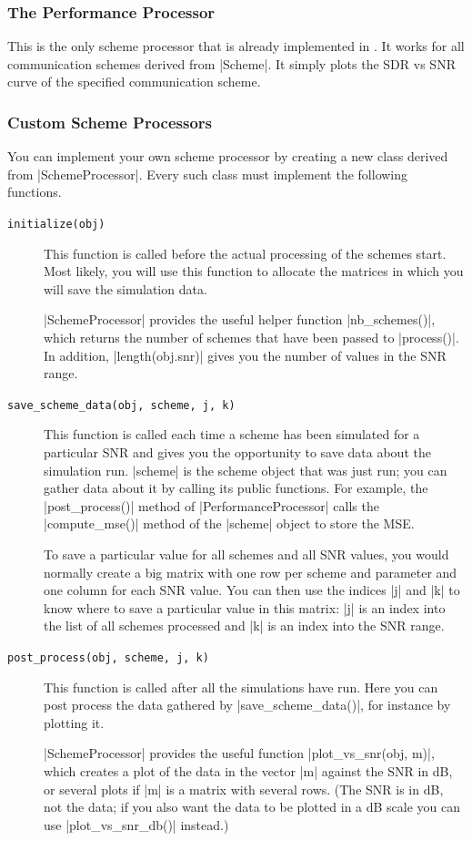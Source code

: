 \subsubsection{The Performance Processor}

This is the only scheme processor that is already implemented in \jscsim. It
works for all communication schemes derived from |Scheme|. It simply plots the
SDR vs SNR curve of the specified communication scheme. 


\subsubsection{Custom Scheme Processors}

You can implement your own scheme processor by creating a new class derived from
|SchemeProcessor|. Every such class must implement the following functions.
\begin{description}
  \item[\texttt{initialize(obj)}] This function is called before the actual
    processing of the schemes start. Most likely, you will use this function to
    allocate the matrices in which you will save the simulation data. 

    |SchemeProcessor| provides the useful helper function |nb_schemes()|, which
    returns the number of schemes that have been passed to |process()|. In
    addition, |length(obj.snr)| gives you the number of values in the SNR range.

  \item[\texttt{save\_scheme\_data(obj, scheme, j, k)}] This function is called
    each time a scheme has been simulated for a particular SNR and gives you the
    opportunity to save data about the simulation run. |scheme| is the scheme
    object that was just run; you can gather data about it by calling its public
    functions. For example, the |post_process()| method of
    |PerformanceProcessor| calls the |compute_mse()| method of the |scheme|
    object to store the MSE.

    To save a particular value for all schemes and all SNR values, you would
    normally create a big matrix with one row per scheme and parameter and one
    column for each SNR value. You can then use the indices |j| and |k| to know
    where to save a particular value in this matrix: |j| is an index into the
    list of all schemes processed and |k| is an index into the SNR range.

  \item[\texttt{post\_process(obj, scheme, j, k)}] This function is called after
    all the simulations have run. Here you can post process the data gathered by
    |save_scheme_data()|, for instance by plotting it.

    |SchemeProcessor| provides the useful function |plot_vs_snr(obj, m)|, which
    creates a plot of the data in the vector |m| against the SNR in dB, or
    several plots if |m| is a matrix with several rows. (The SNR is in dB, not
    the data; if you also want the data to be plotted in a dB scale you can use
    |plot_vs_snr_db()| instead.)
\end{description}


